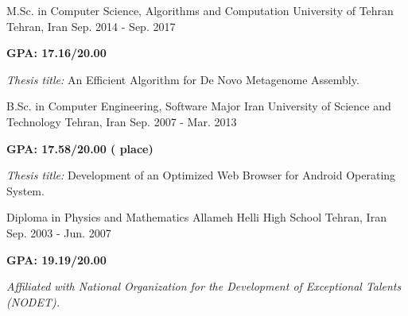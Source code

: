 
\begin{cventries}

  \cventry
    {M.Sc. in Computer Science, Algorithms and Computation} %
    {University of Tehran} %
    {Tehran, Iran} %
    {Sep. 2014 - Sep. 2017} %
    {
      \begin{cvitems}
        \item {\textbf{GPA: 17.16/20.00}}
        \item {\textit{Thesis title:} An Efficient Algorithm for De Novo Metagenome Assembly.}
      \end{cvitems}
    }
    
  \cventry
    {B.Sc. in Computer Engineering, Software Major} %
    {Iran University of Science and Technology} %
    {Tehran, Iran} %
    {Sep. 2007 - Mar. 2013} %
    {
      \begin{cvitems}
        \item {\textbf{GPA: 17.58/20.00 ( place)}}
        \item {\textit{Thesis title:} Development of an Optimized Web Browser for Android Operating System.}
      \end{cvitems}
    }

  \cventry
    {Diploma in Physics and Mathematics} %
    {Allameh Helli High School} %
    {Tehran, Iran} %
    {Sep. 2003 - Jun. 2007} %
    {
      \begin{cvitems}
        \item {\textbf{GPA: 19.19/20.00}}
        \item {\textit{Affiliated with National Organization for the Development of Exceptional Talents (NODET).}}
      \end{cvitems}
    }
    
\end{cventries}
